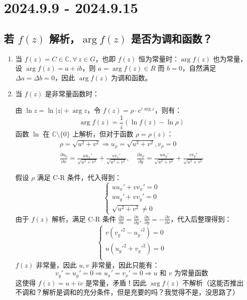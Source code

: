 \documentclass[UTF8]{report}
\def\C{\mathbb{C}}
\theoremstyle{MyLineTheoremStyle} %
\theoremstyle{MyBlockTheoremStyle} %
\theoremstyle{MySubsubsectionStyle} %
\begin{document}
\chapter{2024.9.9 - 2024.9.15}\thispagestyle{fancy}

\section{若 $f(z)$ 解析，$\arg f(z)$ 是否为调和函数？}

\begin{enumerate}
\item 当 $f(z) = C \in \C, \forall\ z \in G$，也即 $f(z)$ 恒为常量时：$\arg f(z)$ 也为常量，设 $\arg f(z) = a + ib$，则 $a = \arg f(z) \in R$ 而 $b=0$，自然满足 $\Delta a = \Delta b =0$，因此 $\arg f(z)$ 为调和函数。
\item 当 $f(z)$ 是非常量函数时：

由 $\ln z = \ln | z | + \arg z$，令 $f(z) = \rho\cdot e^{i\arg z}$，则有：
\begin{equation}
\arg f(z) = \frac{1}{i}\left(\ln f(z) - \ln \rho\right)
\end{equation}
函数 $\ln$ 在 $\C \setminus \{0\}$ 上解析，但对于函数 $\rho = \rho(z)$：
\begin{gather}
\rho = \sqrt{u^2 + v^2}\Longrightarrow u_\rho = \sqrt{u^2+v^2}, v_\rho = 0  \\ 
\frac{\partial u_\rho }{\partial x }
= \frac{uu_x'}{\sqrt{u^2+v^2} } + \frac{vv_x'}{\sqrt{u^2+v^2} },\quad \frac{\partial u_\rho }{\partial y } = \frac{uu_y'}{\sqrt{u^2+v^2} } + \frac{vv_y'}{\sqrt{u^2+v^2} }
\end{gather}

假设 $\rho$ 满足 C-R 条件，代入得到：
\begin{equation}
\begin{cases}
    uu_x' + vv_x' = 0 \\ 
    uu_y' + vv_y' = 0 \\ 
    \sqrt{u^2+v^2} \ne 0
\end{cases}
\end{equation}
由于 $f(z)$ 解析，满足 C-R 条件 $\frac{\partial u }{\partial x } = \frac{\partial v }{\partial y },\ \frac{\partial u }{\partial y } = - \frac{\partial v }{\partial x }$，代入后整理得到：
\begin{equation}
\begin{cases}
    v(v_y'^2 - u_y'^2) = 0 \\ 
    u(u_y'^2 + v_y'^2) = 0 \\ 
\end{cases}
\end{equation}
$f(z)$ 非常量，因此 $u,v$ 非常量，因此只能有：
\begin{equation}
    v_y' = u_y' = 0 \Longrightarrow  u_x' = v_x' = 0 \Longrightarrow  \text{$u$ 和 $v$ 为常量函数}
\end{equation}
这使得 $f(z) = u +iv$ 是常量，矛盾！因此 $\arg f(z)$ 不解析（这能否推出不调和？解析是调和的充分条件，但是充要的吗？我觉得不是，没思路了）
\end{enumerate}
\end{document}
